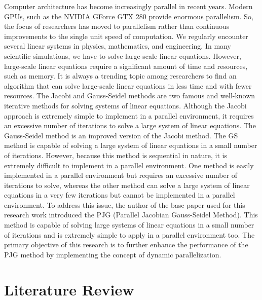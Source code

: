\documentclass[11pt]{article}       %
\begin{document}
Computer architecture has become increasingly parallel in recent years. Modern GPUs, such as the NVIDIA GForce GTX 280 provide enormous parallelism. So, the focus of researchers has moved to parallelism rather than continuous improvements to the single unit speed of computation. We regularly encounter several linear systems in physics, mathematics, and engineering. In many scientific simulations, we have to solve large-scale linear equations. However, large-scale linear equations require a significant amount of time and resources, such as memory. It is always a trending topic among researchers to find an algorithm that can solve large-scale linear equations in less time and with fewer resources. The Jacobi and Gauss-Seidel methods are two famous and well-known iterative methods for solving systems of linear equations. Although the Jacobi approach is extremely simple to implement in a parallel environment, it requires an excessive number of iterations to solve a large system of linear equations. The Gauss-Seidel method is an improved version of the Jacobi method. The GS method is capable of solving a large system of linear equations in a small number of iterations. However, because this method is sequential in nature, it is extremely difficult to implement in a parallel environment. One method is easily implemented in a parallel environment but requires an excessive number of iterations to solve, whereas the other method can solve a large system of linear equations in a very few iterations but cannot be implemented in a parallel environment. To address this issue, the author of the base paper used for this research work introduced the PJG (Parallel Jacobian Gauss-Seidel Method). This method is capable of solving large systems of linear equations in a small number of iterations and is extremely simple to apply in a parallel environment too. The primary objective of this research is to further enhance the performance of the PJG method by implementing the concept of dynamic parallelization.

\section{Literature Review} \label{litrev}
\end{document}
